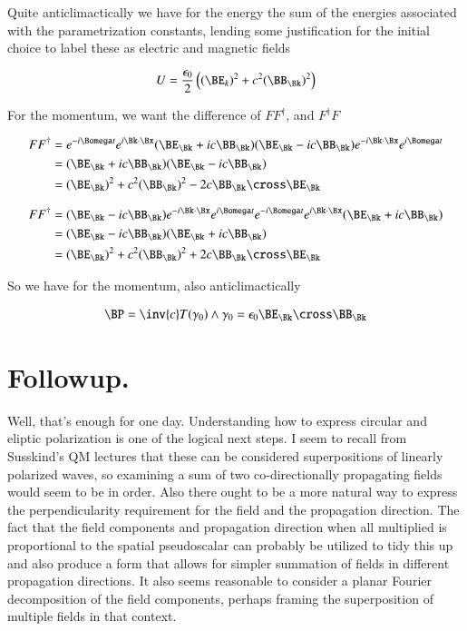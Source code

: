 Quite anticlimactically we have for the energy the sum of the energies associated with the parametrization constants, lending some justification for the initial choice to label these as electric and magnetic fields

\begin{align}
U = \frac{\epsilon_0}{2} \left( (\BE_k)^2 + c^2 (\BB_\Bk)^2\right)
\end{align}

For the momentum, we want the difference of $F F^\dagger$, and $F^\dagger F$

\begin{align*}
F F^\dagger 
&= e^{-i\Bomega t} e^{i \Bk \cdot \Bx} (\BE_\Bk + i c \BB_\Bk) (\BE_\Bk - i c \BB_\Bk) e^{-i \Bk \cdot \Bx} e^{i\Bomega t}  \\
&= (\BE_\Bk + i c \BB_\Bk) (\BE_\Bk - i c \BB_\Bk) \\
&= (\BE_\Bk)^2 + c^2 (\BB_\Bk)^2 - 2 c \BB_\Bk \cross \BE_\Bk
\end{align*}

\begin{align*}
F F^\dagger 
&= (\BE_\Bk - i c \BB_\Bk) e^{-i \Bk \cdot \Bx} e^{i\Bomega t}  e^{-i\Bomega t} e^{i \Bk \cdot \Bx} (\BE_\Bk + i c \BB_\Bk)  \\
&= (\BE_\Bk - i c \BB_\Bk) (\BE_\Bk + i c \BB_\Bk) \\
&= (\BE_\Bk)^2 + c^2 (\BB_\Bk)^2 + 2 c \BB_\Bk \cross \BE_\Bk
\end{align*}

So we have for the momentum, also anticlimactically

\begin{align}
\BP = \inv{c} T(\gamma_0) \wedge \gamma_0 = \epsilon_0 \BE_\Bk \cross \BB_\Bk 
\end{align}

\section{Followup.}

Well, that's enough for one day.  Understanding how to express circular and eliptic polarization is one of the logical next steps.  I seem to recall from Susskind's QM lectures that these can be considered superpositions of linearly polarized waves, so examining a sum of two co-directionally propagating fields would seem to be in order.  Also there ought to be a more natural way to express the perpendicularity requirement for the field and the propagation direction.  The fact that the field components and propagation direction when all multiplied is proportional to the spatial pseudoscalar can probably be utilized to tidy this up and also produce a form that allows for simpler summation of fields in different propagation directions.  It also seems reasonable to consider a planar Fourier decomposition of the field components, perhaps framing the superposition of multiple fields in that context.

